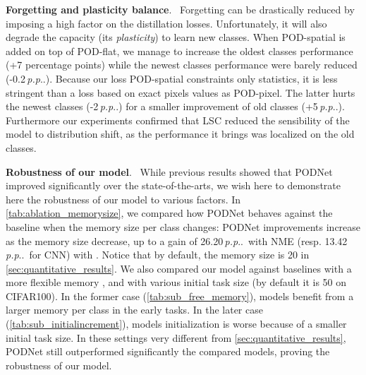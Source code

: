 \documentclass[runningheads]{llncs}
\makeatletter
\newcommand{\fs}{\@ifnextchar.{}{.}}\makeatother
\newcommand{\parag}[1]{\vspace{0.2cm}\noindent\textbf{#1}.\ }
\newcommand{\pp}{\,\textit{p.p}\fs}
\makeatother
\begin{document}
\parag{Forgetting and plasticity balance} Forgetting can be drastically reduced by imposing a high factor on the distillation losses. Unfortunately, it will also degrade the capacity (its \textit{plasticity}) to learn new classes. When POD-spatial is added on top of POD-flat, we manage to increase the oldest classes performance (+7 percentage points) while the newest classes performance were barely reduced (-0.2\pp). Because our loss POD-spatial constraints only statistics, it is less stringent than a loss based on exact pixels values as POD-pixel. The latter hurts the newest classes (-2\pp) for a smaller improvement of old classes (+5\pp). Furthermore our experiments confirmed that LSC reduced the sensibility of the model to distribution shift, as the performance it brings was localized on the old classes.

\label{sec:robustness}
\parag{Robustness of our model} While previous results showed that PODNet improved significantly over the state-of-the-arts, we wish here to demonstrate here the robustness of our model to various factors. In \autoref{tab:ablation_memorysize}, we compared how PODNet behaves against the baseline when the memory size per class  changes: PODNet improvements increase as the memory size decrease, up to a gain of 26.20\pp\ with NME (resp. 13.42\pp\ for CNN) with . Notice that by default, the memory size is 20 in \autoref{sec:quantitative_results}.
We also compared our model against baselines with a more flexible memory  \cite{rebuffi2017icarl,wu2019bias_correction}, and with various initial task size (by default it is 50 on CIFAR100). In the former case (\autoref{tab:sub_free_memory}), models benefit from a larger memory per class in the early tasks. In the later case (\autoref{tab:sub_initialincrement}), models initialization is worse because of a smaller initial task size. In these settings very different from \autoref{sec:quantitative_results}, PODNet still outperformed significantly the compared models, proving the robustness of our model.
\end{document}
